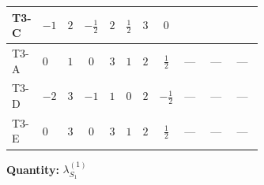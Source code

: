 \documentclass[8pt]{article}
\begin{document}
\begin{landscape}
\begin{longtable}{@{}llcccccc >{\raggedright\arraybackslash}p{0.21\linewidth} >{\raggedright\arraybackslash}p{0.21\linewidth} >{\raggedright\arraybackslash}p{0.21\linewidth}@{}}
\midrule
T3-C & $-1$ & $2$ & $-\frac{1}{2}$ & $2$ & $\frac{1}{2}$ & $3$ & $0$ & \scriptsize\adjustbox{max width=\linewidth}{$\begin{gathered} 8 {\lambda_7} \left({\lambda_7}\right)^{*}\end{gathered}$} & \scriptsize\adjustbox{max width=\linewidth}{$\begin{gathered} +8 {\lambda_9} \left({\lambda_9}\right)^{*}\end{gathered}$} & \scriptsize\adjustbox{max width=\linewidth}{$\begin{gathered} +24 {\lambda_{11}} \left({\lambda_{11}}\right)^{*}\end{gathered}$} \\
\midrule
T3-A & $0$ & $1$ & $0$ & $3$ & $1$ & $2$ & $\frac{1}{2}$ & --- & --- & --- \\
\midrule
T3-D & $-2$ & $3$ & $-1$ & $1$ & $0$ & $2$ & $-\frac{1}{2}$ & --- & --- & --- \\
\midrule
T3-E & $0$ & $3$ & $0$ & $3$ & $1$ & $2$ & $\frac{1}{2}$ & --- & --- & --- \\
\midrule
\bottomrule
\end{longtable}
\clearpage
\noindent\textbf{Quantity: }$\lambda_{S_1}^{(1)}$\par\smallskip

\end{landscape}
\end{document}
